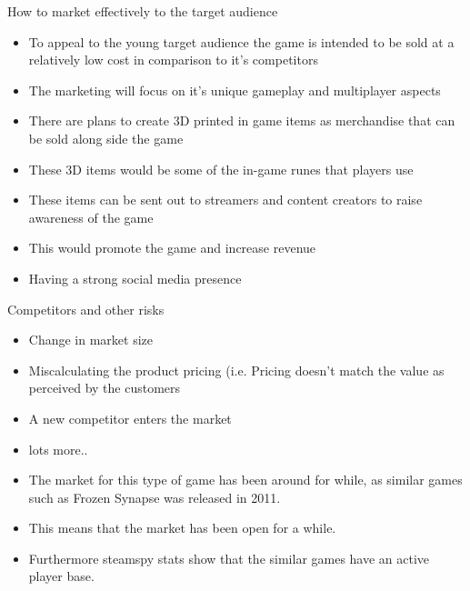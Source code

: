 \documentclass{beamer}
\begin{document}
\begin{frame}{How to market effectively to the target audience}
	\begin{itemize}
	\item To appeal to the young target audience the game is intended to be sold at a relatively low cost in comparison to it's competitors \pause
	\item The marketing will focus on it's unique gameplay and multiplayer aspects \pause
	\end{itemize}	
	
	\begin{itemize}
		\item There are plans to create 3D printed in game items as merchandise that can be sold along side the game \pause
		\item These 3D items would be some of the in-game runes that players use \pause
		\item These items can be sent out to streamers and content creators to raise awareness of the game \pause
		\item This would promote the game and increase revenue \pause
		\item Having a strong social media presence \pause
	\end{itemize}
	
	
\end{frame}

\begin{frame}{Competitors and other risks}
	\begin{itemize}
		\item Change in market size \pause
		\item Miscalculating the product pricing (i.e. Pricing doesn't match the value as perceived by the customers \pause
		\item A new competitor enters the market \pause
		\item lots more.. \pause
	\end{itemize}
	\begin {itemize}
	\item The market for this type of game has been around for while, as similar games such as Frozen Synapse was released in 2011. \pause
	\item This means that the market has been open for a while. \pause
	\item Furthermore steamspy stats show that the similar games have an active player base. \pause
	\end{itemize}
	
	
	
	
\end{frame}
\end{document}
